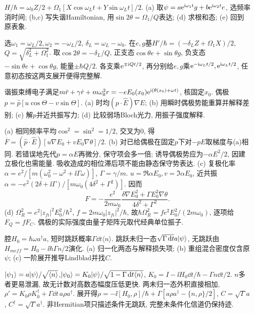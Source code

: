 \begin{exercise}$H/\hbar=\omega_0Z/2+\Omega_1[X\cos\omega_Lt+Y\sin\omega_Lt]/2$. (a) 取$\psi=a\mathrm e^{\mathrm i\omega_1t}g+b\mathrm e^{\mathrm i\omega_2t}e$, 选频率消时间; (b,c) 写失谐Hamiltonian, 用$\sin2\theta=\Omega_1/Q$表达; (d) 求根和态; (e) 回到原表象.\end{exercise}
\begin{solution}选$\omega_1=\omega_L/2,\omega_2=-\omega_L/2$, $\delta_L=\omega_L-\omega_0$. 在$e,g$基$H'/\hbar=(-\delta_LZ+\Omega_1X)/2$, $Q=\sqrt{\delta_L^2+\Omega_1^2}$. 取$\cos2\theta=-\delta_L/Q$, 正支态$\cos\theta e+\sin\theta g$, 负支态$-\sin\theta e+\cos\theta g$, 能量$\pm\hbar Q/2$. 各支乘$\mathrm e^{\mp\mathrm i Qt/2}$, 再分别给$e,g$乘$\mathrm e^{-\mathrm i\omega_Lt/2},\mathrm e^{\mathrm i\omega_Lt/2}$, 任意初态按这两支展开便得完整解.
\end{solution}

\begin{exercise}谐振束缚电子满足$m\ddot r+\gamma\dot r+m\omega_0^2r=-eE_0(x_0)\mathrm e^{\mathrm i(\theta(x_0)+\omega t)}$, 核固定$x_0$. 偶极$p=\hat p[u\cos\Theta-v\sin\Theta]$. (a) 时均$(p\cdot\hat E)\nabla E$; (b) 用瞬时偶极势能重算并解释差别; (c) 解$p$并近共振写力; (d) 比较弱场Bloch光力, 用振子强度解释.\end{exercise}
\begin{solution}(a) 相同频率平均$\cos^2=\sin^2=1/2$, 交叉为0, 得$\overline F=(\hat p\cdot\hat E)[u\nabla E_0+vE_0\nabla\theta]/2$. (b) 对已给偶极在固定$p$下对$-pE$取梯度与(a)相同. 若错误地先代$p=\alpha E$再微分, 保守项会多一倍; 诱导偶极势应为$-\alpha E^2/2$, 因建立极化也需能量. 吸收造成的相位滞后项不能由静态保守势表达. (c) 复极化率$\alpha=e^2/[m(\omega_0^2-\omega^2+\ii\Gamma\omega)]$, $\Gamma=\gamma/m$. $u=\Re\alpha E_0,v=\Im\alpha E_0$, 近共振$\alpha=-e^2(2\delta+\ii\Gamma)/[m\omega_0(4\delta^2+\Gamma^2)]$. 因而
\[F=-\frac{e^2}{2m\omega_0}\frac{\delta\nabla E_0^2+\Gamma E_0^2\nabla\theta}{4\delta^2+\Gamma^2}.\]
(d) $\Omega_R^2=e^2|z_{fi}|^2E_0^2/\hbar^2$, $f=2m\omega_0|z_{fi}|^2/\hbar$, 故$\hbar\Omega_R^2=f e^2E_0^2/(2m\omega_0)$, 逐项给$F_Q=fF_C$. 偶极的实际强度由量子矩阵元取代经典单位振子.
\end{solution}
\begin{exercise}腔$H_0=\hbar\omega a^\dagger a$, 短时跳跃概率$\Gamma\dd t\langle n\rangle$. 跳跃未归一态$\sqrt{\Gamma\,\mathrm d t}a\lvert \psi\rangle$, 无跳跃由$H_{
m eff}=H_0-\ii\hbar\Gamma n/2$演化. (a) 归一化两态与解释损失项; (b) 重组混合密度仅含原$\psi$; (c) 一阶展开推导Lindblad并找$C$.\end{exercise}
\begin{solution}$\lvert \psi_1\rangle=a\lvert \psi\rangle/\sqrt{\langle n\rangle}$,$\lvert \psi_0\rangle=K_0\lvert \psi\rangle/\sqrt{1-\Gamma\,\mathrm d t\langle n\rangle}$, $K_0=I-\ii H_0\dd t/\hbar-\Gamma n\dd t/2$. $n$多者更易泄漏, 故无计数对高数态幅度压低更快. 两未归一态外积直接相加,$\rho'=K_0\rho K_0^\dagger+\Gamma\dd t\,a\rho a^\dagger$. 展开得$\dot\rho=-\ii[H_0,\rho]/\hbar+\Gamma[a\rho a^\dagger-\{n,\rho\}/2]$, $C=\sqrt\Gamma a$, $C^\dagger=\sqrt\Gamma a^\dagger$. 非Hermitian项只描述条件无跳跃, 完整未条件化信道仍保持迹.
\end{solution}

